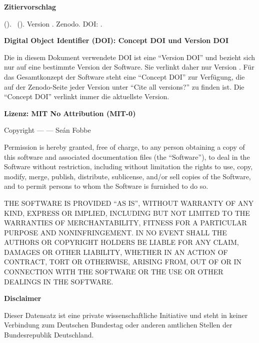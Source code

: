 \vspace{0.5cm}

\textbf{Zitiervorschlag}

\emph{\dataauthor} (\the\year ). \softwaretitle\ (\softwareshort ). Version \version . Zenodo. DOI: \softwareversiondoi .


\vspace{0.5cm}

\textbf{Digital Object Identifier (DOI): Concept DOI und Version DOI}

Die in diesem Dokument verwendete DOI ist eine \enquote{Version DOI} und bezieht sich nur auf eine bestimmte Version der Software. Sie verlinkt daher nur Version \version . Für das Gesamtkonzept der Software steht eine \enquote{Concept DOI} zur Verfügung, die auf der Zenodo-Seite jeder Version unter \enquote{Cite all versions?} zu finden ist. Die \enquote{Concept DOI} verlinkt immer die aktuellste Version.

\vspace{0.5cm}


\textbf{Lizenz: MIT No Attribution (MIT-0)}

Copyright --- \the\year --- Seán Fobbe

Permission is hereby granted, free of charge, to any person obtaining a copy of this software and associated documentation files (the \enquote{Software}), to deal in the Software without restriction, including without limitation the rights to use, copy, modify, merge, publish, distribute, sublicense, and/or sell copies of the Software, and to permit persons to whom the Software is furnished to do so.

 
THE SOFTWARE IS PROVIDED \enquote{AS IS}, WITHOUT WARRANTY OF ANY KIND, EXPRESS OR IMPLIED, INCLUDING BUT NOT LIMITED TO THE WARRANTIES OF MERCHANTABILITY, FITNESS FOR A PARTICULAR PURPOSE AND NONINFRINGEMENT. IN NO EVENT SHALL THE AUTHORS OR COPYRIGHT HOLDERS BE LIABLE FOR ANY CLAIM, DAMAGES OR OTHER LIABILITY, WHETHER IN AN ACTION OF CONTRACT, TORT OR OTHERWISE, ARISING FROM, OUT OF OR IN CONNECTION WITH THE SOFTWARE OR THE USE OR OTHER DEALINGS IN THE SOFTWARE. 


\vspace{0.5cm}

\textbf{Disclaimer} 

Dieser Datensatz ist eine private wissenschaftliche Initiative und steht in keiner Verbindung zum Deutschen Bundestag oder anderen amtlichen Stellen der Bundesrepublik Deutschland.

\newpage